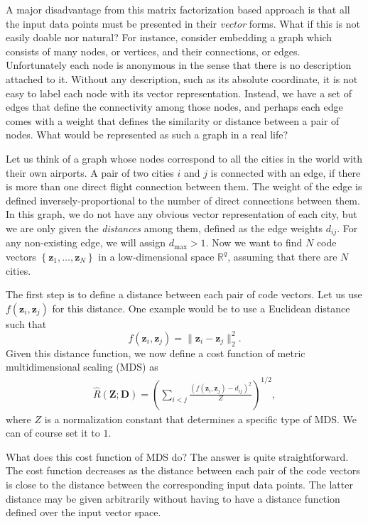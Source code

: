\documentclass{report}
\newcommand{\vect}[1]{\mathbf{#1}}
\newcommand{\matr}[1]{\mathbf{#1}}
\newcommand{\vz}[0]{\vect{z}}
\newcommand{\mZ}[0]{\matr{Z}}
\newcommand{\mD}{\matr{D}}
\newcommand{\RR}[0]{\mathbb{R}}
\begin{document}
A major disadvantage from this matrix factorization based approach is that all
the input data points must be presented in their {\it vector} forms. What if
this is not easily doable nor natural? For instance, consider embedding a graph
which consists of many nodes, or vertices, and their connections, or edges.
Unfortunately each node is anonymous in the sense that there is no description
attached to it. Without any description, such as its absolute coordinate, it is
not easy to label each node with its vector representation. Instead, we have a
set of edges that define the connectivity among those nodes, and perhaps each
edge comes with a weight that defines the similarity or distance between a pair
of nodes. What would be represented as such a graph in a real life? 

Let us think of a graph whose nodes correspond to all the cities in the world
with their own airports. A pair of two cities $i$ and $j$ is connected with an
edge, if there is more than one direct flight connection between them. The
weight of the edge is defined inversely-proportional to the number of direct
connections between them. In this graph, we do not have any obvious vector
representation of each city, but we are only given the {\it distances} among
them, defined as the edge weights $d_{ij}$. For any non-existing edge, we will
assign $d_{\max} > 1$.  Now we want to find $N$ code vectors $\left\{ \vz_1,
\ldots, \vz_N \right\}$ in a low-dimensional space $\RR^q$, assuming that there
are $N$ cities. 

The first step is to define a distance between each pair of code vectors. Let us
use $f(\vz_i, \vz_j)$ for this distance. One example would be to use a Euclidean
distance such that
\[
    f(\vz_i, \vz_j) = \| \vz_i - \vz_j \|_2^2.
\]
Given this distance function, we now define a cost function of metric
multidimensional scaling (MDS) as
\begin{align}
    \label{eq:mds}
    \hat{R}(\mZ; \mD) = \left(
        \sum_{i < j} \frac{
            (f(\vz_i, \vz_j) - d_{ij})^2
        }{Z}
    \right)^{1/2},
\end{align}
where $Z$ is a normalization constant that determines a specific type of MDS. We
can of course set it to $1$.

What does this cost function of MDS do? The answer is quite straightforward. The
cost function decreases as the distance between each pair of the code vectors is
close to the distance between the corresponding input data points. The latter
distance may be given arbitrarily without having to have a distance function
defined over the input vector space. 
\end{document}
